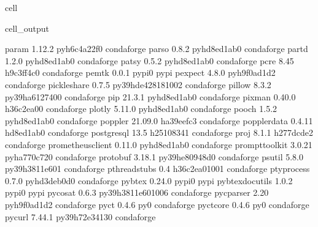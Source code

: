 \documentclass[letterpaper,table,10pt,english]{jupyterBook}
\begin{document}
\begin{sphinxuseclass}{cell}
\begin{sphinxVerbatimOutput}
\begin{sphinxuseclass}{cell_output}
\begin{sphinxVerbatim}[commandchars=\\\{\}]
param                     1.12.2             pyh6c4a22f\PYGZus{}0    conda\PYGZhy{}forge
parso                     0.8.2              pyhd8ed1ab\PYGZus{}0    conda\PYGZhy{}forge
partd                     1.2.0              pyhd8ed1ab\PYGZus{}0    conda\PYGZhy{}forge
patsy                     0.5.2              pyhd8ed1ab\PYGZus{}0    conda\PYGZhy{}forge
pcre                      8.45                 h9c3ff4c\PYGZus{}0    conda\PYGZhy{}forge
pemtk                     0.0.1                    pypi\PYGZus{}0    pypi
pexpect                   4.8.0              pyh9f0ad1d\PYGZus{}2    conda\PYGZhy{}forge
pickleshare               0.7.5           py39hde42818\PYGZus{}1002    conda\PYGZhy{}forge
pillow                    8.3.2            py39ha612740\PYGZus{}0    conda\PYGZhy{}forge
pip                       21.3.1             pyhd8ed1ab\PYGZus{}0    conda\PYGZhy{}forge
pixman                    0.40.0               h36c2ea0\PYGZus{}0    conda\PYGZhy{}forge
plotly                    5.11.0             pyhd8ed1ab\PYGZus{}0    conda\PYGZhy{}forge
pooch                     1.5.2              pyhd8ed1ab\PYGZus{}0    conda\PYGZhy{}forge
poppler                   21.09.0              ha39eefc\PYGZus{}3    conda\PYGZhy{}forge
poppler\PYGZhy{}data              0.4.11               hd8ed1ab\PYGZus{}0    conda\PYGZhy{}forge
postgresql                13.5                 h2510834\PYGZus{}1    conda\PYGZhy{}forge
proj                      8.1.1                h277dcde\PYGZus{}2    conda\PYGZhy{}forge
prometheus\PYGZus{}client         0.11.0             pyhd8ed1ab\PYGZus{}0    conda\PYGZhy{}forge
prompt\PYGZhy{}toolkit            3.0.21             pyha770c72\PYGZus{}0    conda\PYGZhy{}forge
protobuf                  3.18.1           py39he80948d\PYGZus{}0    conda\PYGZhy{}forge
psutil                    5.8.0            py39h3811e60\PYGZus{}1    conda\PYGZhy{}forge
pthread\PYGZhy{}stubs             0.4               h36c2ea0\PYGZus{}1001    conda\PYGZhy{}forge
ptyprocess                0.7.0              pyhd3deb0d\PYGZus{}0    conda\PYGZhy{}forge
pybtex                    0.24.0                   pypi\PYGZus{}0    pypi
pybtex\PYGZhy{}docutils           1.0.2                    pypi\PYGZus{}0    pypi
pycosat                   0.6.3           py39h3811e60\PYGZus{}1006    conda\PYGZhy{}forge
pycparser                 2.20               pyh9f0ad1d\PYGZus{}2    conda\PYGZhy{}forge
pyct                      0.4.6                      py\PYGZus{}0    conda\PYGZhy{}forge
pyct\PYGZhy{}core                 0.4.6                      py\PYGZus{}0    conda\PYGZhy{}forge
pycurl                    7.44.1           py39h72e3413\PYGZus{}0    conda\PYGZhy{}forge

\end{sphinxVerbatim}
\end{sphinxuseclass}
\end{sphinxVerbatimOutput}
\end{sphinxuseclass}
\end{document}
